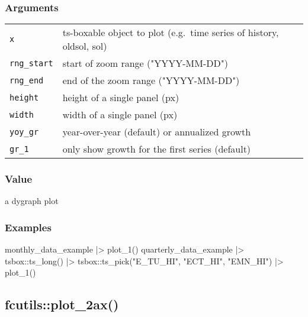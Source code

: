 \documentclass[
  letterpaper,
  DIV=11,
  numbers=noendperiod]{scrreport}
\newenvironment{Shaded}{\begin{snugshade}}{\end{snugshade}}
\newcommand{\FunctionTok}[1]{\textcolor[rgb]{0.28,0.35,0.67}{#1}}
\newcommand{\NormalTok}[1]{\textcolor[rgb]{0.00,0.23,0.31}{#1}}
\newcommand{\SpecialCharTok}[1]{\textcolor[rgb]{0.37,0.37,0.37}{#1}}
\newcommand{\StringTok}[1]{\textcolor[rgb]{0.13,0.47,0.30}{#1}}
\begin{document}
\subsubsection{Arguments}\label{arguments-63}

\begin{longtable}[]{@{}ll@{}}
\toprule\noalign{}
\endhead
\bottomrule\noalign{}
\endlastfoot
\texttt{x} & ts-boxable object to plot (e.g.~time series of history,
oldsol, sol) \\
\texttt{rng\_start} & start of zoom range ("YYYY-MM-DD") \\
\texttt{rng\_end} & end of the zoom range ("YYYY-MM-DD") \\
\texttt{height} & height of a single panel (px) \\
\texttt{width} & width of a single panel (px) \\
\texttt{yoy\_gr} & year-over-year (default) or annualized growth \\
\texttt{gr\_1} & only show growth for the first series (default) \\
\end{longtable}

\subsubsection{Value}\label{value-61}

a dygraph plot

\subsubsection{Examples}\label{examples-63}

\begin{Shaded}
\begin{Highlighting}[]
\NormalTok{monthly\_data\_example }\SpecialCharTok{|\textgreater{}}
  \FunctionTok{plot\_1}\NormalTok{()}
\NormalTok{quarterly\_data\_example }\SpecialCharTok{|\textgreater{}}
\NormalTok{  tsbox}\SpecialCharTok{::}\FunctionTok{ts\_long}\NormalTok{() }\SpecialCharTok{|\textgreater{}}
\NormalTok{  tsbox}\SpecialCharTok{::}\FunctionTok{ts\_pick}\NormalTok{(}\StringTok{"E\_TU\_HI"}\NormalTok{, }\StringTok{"ECT\_HI"}\NormalTok{, }\StringTok{"EMN\_HI"}\NormalTok{) }\SpecialCharTok{|\textgreater{}}
  \FunctionTok{plot\_1}\NormalTok{()}
\end{Highlighting}
\end{Shaded}

\subsection{fcutils::plot\_2ax()}\label{fcutilsplot_2ax}
\end{document}
